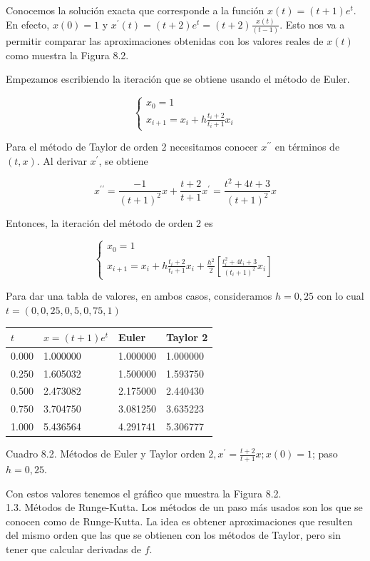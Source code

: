 \documentclass[10pt]{article}
\begin{document}
Conocemos la solución exacta que corresponde a la función $x(t)=(t+1) e^{t}$. En efecto, $x(0)=1$ y $x^{\prime}(t)=(t+2) e^{t}=(t+2) \frac{x(t)}{(t-1)}$. Esto nos va a permitir comparar las aproximaciones obtenidas con los valores reales de $x(t)$ como muestra la Figura 8.2.

Empezamos escribiendo la iteración que se obtiene usando el método de Euler.

$$
\left\{\begin{array}{l}
x_{0}=1 \\
x_{i+1}=x_{i}+h \frac{t_{i}+2}{t_{i}+1} x_{i}
\end{array}\right.
$$

Para el método de Taylor de orden 2 necesitamos conocer $x^{\prime \prime}$ en términos de $(t, x)$. Al derivar $x^{\prime}$, se obtiene

$$
x^{\prime \prime}=\frac{-1}{(t+1)^{2}} x+\frac{t+2}{t+1} x^{\prime}=\frac{t^{2}+4 t+3}{(t+1)^{2}} x
$$

Entonces, la iteración del método de orden 2 es

$$
\left\{\begin{array}{l}
x_{0}=1 \\
x_{i+1}=x_{i}+h \frac{t_{i}+2}{t_{i}+1} x_{i}+\frac{h^{2}}{2}\left[\frac{t_{i}^{2}+4 t_{i}+3}{\left(t_{i}+1\right)^{2}} x_{i}\right]
\end{array}\right.
$$

Para dar una tabla de valores, en ambos casos, consideramos $h=0,25$ con lo cual $t=(0,0,25,0,5,0,75,1)$

\begin{center}
\begin{tabular}{|l|l|l|l|}
\hline
$t$ & $x=(t+1) e^{t}$ & Euler & Taylor 2 \\
\hline
0.000 & 1.000000 & 1.000000 & 1.000000 \\
0.250 & 1.605032 & 1.500000 & 1.593750 \\
0.500 & 2.473082 & 2.175000 & 2.440430 \\
0.750 & 3.704750 & 3.081250 & 3.635223 \\
1.000 & 5.436564 & 4.291741 & 5.306777 \\
\hline
\end{tabular}
\end{center}

Cuadro 8.2. Métodos de Euler y Taylor orden $2, x^{\prime}=\frac{t+2}{t+1} x ; x(0)=1$; paso $h=0,25$.

Con estos valores tenemos el gráfico que muestra la Figura 8.2.\\
1.3. Métodos de Runge-Kutta. Los métodos de un paso más usados son los que se conocen como de Runge-Kutta. La idea es obtener aproximaciones que resulten del mismo orden que las que se obtienen con los métodos de Taylor, pero sin tener que calcular derivadas de $f$.
\end{document}
